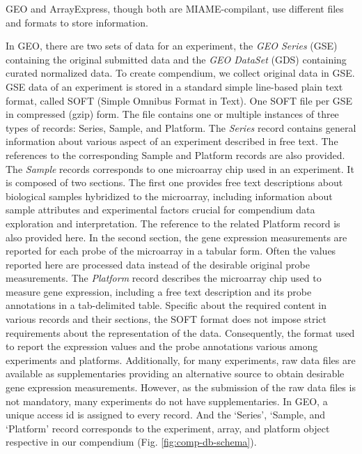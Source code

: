 GEO and ArrayExpress, though both are MIAME-compilant, use different files and
formats to store information. %

%
In GEO, there are two sets of data for an experiment, the \textit{GEO Series}
(GSE) containing the original submitted data and the \textit{GEO DataSet}
(GDS) containing curated normalized data.
%
To create compendium, we collect original data in GSE.
%
GSE data of an experiment is stored in a standard simple line-based plain text
format, called SOFT (Simple Omnibus Format in Text).  One SOFT file per GSE in
compressed (gzip) form.
%
The file contains one or multiple instances of three types of records: Series,
Sample, and Platform.
%
The \textit{Series} record contains general information about various
aspect of an experiment described in free text.  The references to the
corresponding Sample and Platform records are also provided.
%
The \textit{Sample} records corresponds to one microarray chip used in an
experiment.
%
It is composed of two sections.  The first one provides free text descriptions
about biological samples hybridized to the microarray, including information
about sample attributes and experimental factors crucial for compendium data
exploration and interpretation.
%
The reference to the related Platform record is also provided here.
%
In the second section, the gene expression measurements are reported for each
probe of the microarray in a tabular form. Often the values reported here are
processed data instead of the desirable original probe measurements.
%
The \textit{Platform} record describes the microarray chip used to measure
gene expression, including a free text description and its probe annotations
in a tab-delimited table.
%
Specific about the required content in various records and their sections, the
SOFT format does not impose strict requirements about the representation of the
data.
%
Consequently, the format used to report the expression values and the probe
annotations various among experiments and platforms.
%
Additionally, for many experiments, raw data files are available as
supplementaries providing an alternative source to obtain desirable gene
expression measurements.
%
However, as the submission of the raw data files is not mandatory, many
experiments do not have supplementaries.
%
In GEO, a unique access id is assigned to every record.
%
And the `Series', `Sample, and `Platform' record corresponds to the
experiment, array, and platform object respective in our compendium
(Fig. \ref{fig:comp-db-schema}).


